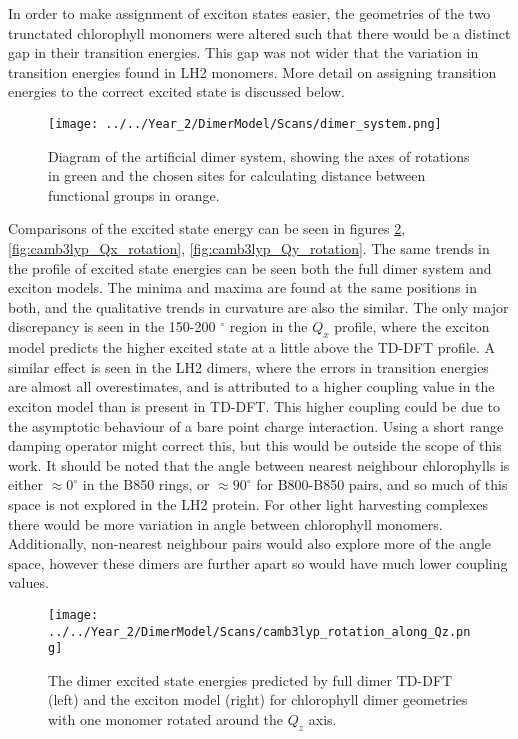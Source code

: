 In order to make assignment of exciton states easier, the geometries of the two 
trunctated chlorophyll monomers were altered such that there would be a distinct 
gap in their transition energies. This gap was not wider that the variation in 
transition energies found in LH2 monomers. More detail on assigning transition 
energies to the correct excited state is discussed below.

\begin{figure}
    \centering
    \texttt{[image: ../../Year\_2/DimerModel/Scans/dimer\_system.png]}
    \label{fig:dimer_system}
    \caption{Diagram of the artificial dimer system, showing the axes of rotations
    in green and the chosen sites for calculating distance between functional groups
    in orange.}
\end{figure}

Comparisons of the excited state energy can be seen in figures \ref{fig:camb3lyp_Qz_rotation},
\ref{fig:camb3lyp_Qx_rotation}, \ref{fig:camb3lyp_Qy_rotation}. The same trends 
in the profile of excited state energies can be seen both the full dimer system 
and exciton models. The minima and maxima are found at the same positions in both, 
and the qualitative trends in curvature are also the similar. The only major discrepancy
is seen in the 150-200 $^{\circ}$ region in the $Q_x$ profile, where the exciton 
model predicts the higher excited state at a little above the TD-DFT profile. A 
similar effect is seen in the LH2 dimers, where the errors in transition energies 
are almost all overestimates, and is attributed to a higher coupling value in the
exciton model than is present in TD-DFT. This higher coupling could be due to the
asymptotic behaviour of a bare point charge interaction. Using a short range damping
operator might correct this, but this would be outside the scope of this work.
It should be noted that the angle between nearest neighbour chlorophylls is either
$\approx 0 ^{\circ}$ in the B850 rings, or $\approx 90 ^{\circ}$ for B800-B850 pairs,
and so much of this space is not explored in the LH2 protein. For other light 
harvesting complexes there would be more variation in angle between chlorophyll 
monomers. Additionally, non-nearest neighbour pairs would also explore more of the 
angle space, however these dimers are further apart so would have much lower coupling
values.

\begin{figure}
    \centering
    \texttt{[image: ../../Year\_2/DimerModel/Scans/camb3lyp\_rotation\_along\_Qz.png]}
    \label{fig:camb3lyp_Qz_rotation}
    \caption{The dimer excited state energies predicted by full dimer TD-DFT (left)
    and the exciton model (right) for chlorophyll dimer geometries with one monomer
    rotated around the $Q_z$ axis.}
\end{figure}

